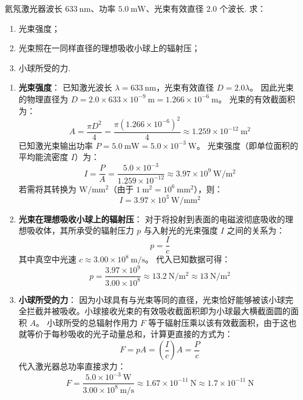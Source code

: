 \begin{exercise}\label{ex:20.7}
氦氖激光器波长 $633 \ \mathrm{nm}$、功率 $5.0 \ \mathrm{mW}$、光束有效直径 $2.0$ 个波长. 求：
\begin{enumerate}
  \item[(a)] 光束强度；
  \item[(b)] 光束照在一同样直径的理想吸收小球上的辐射压；
  \item[(c)] 小球所受的力.
\end{enumerate}
\end{exercise}
\begin{solution}
\begin{enumerate}
    \item[(a)] \textbf{光束强度}：
    已知激光波长 $\lambda = 633 \ \mathrm{nm}$，光束有效直径 $D = 2.0\lambda$。
    因此光束的物理直径为 $D = 2.0 \times 633 \times 10^{-9} \ \mathrm{m} = 1.266 \times 10^{-6} \ \mathrm{m}$。
    光束的有效截面积为：
    $$ A = \frac{\pi D^2}{4} = \frac{\pi (1.266 \times 10^{-6})^2}{4} \approx 1.259 \times 10^{-12} \ \mathrm{m^2} $$
    已知激光束输出功率 $P = 5.0 \ \mathrm{mW} = 5.0 \times 10^{-3} \ \mathrm{W}$。
    光束强度（即单位面积的平均能流密度 $I$）为：
    $$ I = \frac{P}{A} = \frac{5.0 \times 10^{-3}}{1.259 \times 10^{-12}} \approx 3.97 \times 10^9 \ \mathrm{W/m^2} $$
    若需将其转换为 $\mathrm{W/mm^2}$（由于 $1 \ \mathrm{m^2} = 10^6 \ \mathrm{mm^2}$），则：
    $$ I = 3.97 \times 10^3 \ \mathrm{W/mm^2} $$

    \item[(b)] \textbf{光束在理想吸收小球上的辐射压}：
    对于将投射到表面的电磁波彻底吸收的理想吸收体，其所承受的辐射压力 $p$ 与入射光的光束强度 $I$ 之间的关系为：
    $$ p = \frac{I}{c} $$
    其中真空中光速 $c \approx 3.00 \times 10^8 \ \mathrm{m/s}$。
    代入已知数据可得：
    $$ p = \frac{3.97 \times 10^9}{3.00 \times 10^8} \approx 13.2 \ \mathrm{N/m^2} \approx 13 \ \mathrm{N/m^2} $$

    \item[(c)] \textbf{小球所受的力}：
    因为小球具有与光束等同的直径，光束恰好能够被该小球完全拦截并被吸收。小球接收光束的有效吸收截面积即为小球最大横截面圆的面积 $A$。
    小球所受的总辐射作用力 $F$ 等于辐射压乘以该有效截面积，由于这也就等价于每秒吸收的光子动量总和，计算更直接的方式为：
    $$ F = p A = \left( \frac{I}{c} \right) A = \frac{P}{c} $$
    代入激光器总功率直接求力：
    $$ F = \frac{5.0 \times 10^{-3} \ \mathrm{W}}{3.00 \times 10^8 \ \mathrm{m/s}} \approx 1.67 \times 10^{-11} \ \mathrm{N} \approx 1.7 \times 10^{-11} \ \mathrm{N} $$
\end{enumerate}
\end{solution}

